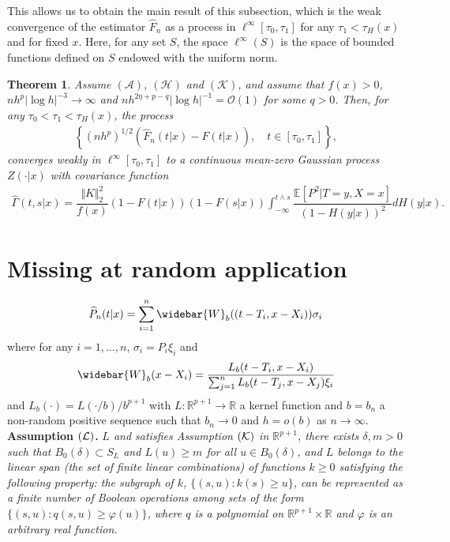 \documentclass[12pt]{article}
\newtheorem{theorem}{Theorem}[section]
\begin{document}
This allows us to obtain the main result of this subsection, which is the weak convergence of the estimator $\widehat{F}_n$ as a process in $\ell^\infty[\tau_0,\tau_1]$ for any $\tau_1 < \tau_H(x)$ and for fixed $x$.  Here, for any set $S$, the space $\ell^\infty(S)$ is the space of bounded functions defined on $S$ endowed with the uniform norm. 

\begin{theorem}
\label{theorem_nesti}
Assume $(\mathcal{A})$, $(\mathcal{H})$ and $(\mathcal{K})$, and assume that $f(x)>0$, $nh^p |\log h|^{-3} \to \infty$ and $nh^{2\eta+p-q} |\log h|^{-1} =\mathcal{O}(1)$ for some $q>0$. Then, for any $\tau_0 < \tau_1<\tau_H(x)$, the process
\begin{eqnarray}
\label{process}
\left\{(nh^p)^{1/2}(\widehat{F}_n(t|x)-F(t|x)),\quad t\in [\tau_0,\tau_1]\right\},
\end{eqnarray}
converges weakly in $\ell^\infty[\tau_0,\tau_1]$ to a continuous mean-zero Gaussian process $Z(\cdot|x)$ with covariance function
\begin{eqnarray*}
\widehat{\Gamma}(t,s|x)=\dfrac{\Vert K\Vert_2^2}{f(x)}(1-F(t|x))(1-F(s|x))\int_{-\infty}^{t\wedge s}\dfrac{\mathbb{E}[P^2|T=y, X=x] }{(1-H(y|x))^2}dH(y|x).
\end{eqnarray*}
\end{theorem}

\newpage
\section{Missing at random application}
\label{section_MAR}

\begin{eqnarray*}
\widehat{P}_n(t|x)=\sum_{i=1}^n\widebar{W}_{b}((t-T_i,x-X_i))\sigma_i
\end{eqnarray*}
where for any $i=1,\ldots,n$, $\sigma_i=P_i\xi_i$ and
\begin{eqnarray*}
\widebar{W}_{b}(x-X_i)=\dfrac{L_{b}(t-T_i,x-X_i)}{\sum_{j=1}^nL_{b}(t-T_j,x-X_j)\xi_i}
\end{eqnarray*}
and $L_{b}(\cdot)=L(\cdot/{b})/b^{p+1}$ with $L:\mathbb{R}^{p+1}\to\mathbb{R}$ a kernel function and $b=b_n$ a non-random positive sequence such that $b_n\rightarrow 0$ and $h=o(b)$ as $n\rightarrow \infty$.\\

{\bf Assumption $({\cal L})$.} {\it $L$ and satisfies Assumption $({\cal K})$ in $\mathbb{R}^{p+1}$, there exists $\delta, m>0$ such that $B_0(\delta) \subset S_L$ and $L(u)\geq m$ for all $u\in B_0(\delta)$, and $L$ belongs to the linear span (the set of finite linear combinations) of functions
$k\ge0$ satisfying the following property: the subgraph of $k$,
$\{(s,u):k(s)\ge u\}$, can be represented as a finite number of
Boolean operations among sets of the form
$\{(s,u):q(s,u)\ge \varphi(u)\}$, where $q$ is a polynomial on $\mathbb R^{p+1}\times \mathbb R$ and $\varphi$ is an arbitrary real function.\\
}
\end{document}
